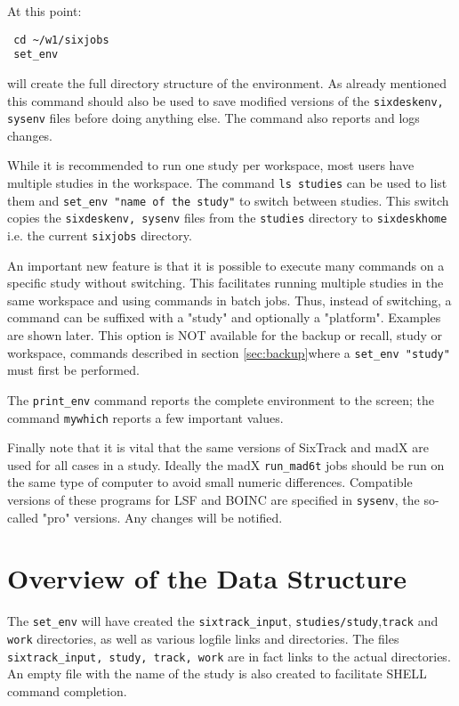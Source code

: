 \documentclass{article}    %
\begin{document}
At this point:
\begin{verbatim}
 cd ~/w1/sixjobs
 set_env
\end{verbatim}
will create the full directory structure of the environment.
As already mentioned this command should also be used to save
modified versions of the {\tt sixdeskenv, sysenv} files before doing
anything else. The command also reports and logs changes. 

While it is recommended to run one study per workspace, most users have
multiple studies in the workspace. The command {\tt ls studies} can be used
to list them and {\tt set\_env "name of the study"} to switch between studies.
This switch copies the {\tt sixdeskenv, sysenv} files from the
{\tt studies} directory to {\tt sixdeskhome} i.e. the current {\tt sixjobs} directory. 

An important new feature is that it is possible to execute many commands
on a specific study without switching. This facilitates running multiple
studies in the same workspace and using commands in batch jobs.  
Thus, instead of switching, a command can be suffixed with a
"study" and optionally a "platform". Examples are shown later.
This option is NOT available for the backup or recall, study or workspace, 
commands described in section \ref{sec:backup}where a {\tt set\_env "study"}
must first be performed.

The {\tt print\_env} command reports the complete environment to the screen;
the command {\tt mywhich} reports a few important values.

Finally note that it is vital that the same versions of SixTrack and madX are used for
all cases in a study. Ideally the madX {\tt run\_mad6t} jobs should be run on the
same type of computer to avoid small numeric differences. Compatible versions of these
programs for LSF and BOINC are specified
in {\tt sysenv}, the so-called "pro" versions. Any changes will
be notified.

\section{Overview of the Data Structure}
The {\tt set\_env} will have created the {\tt sixtrack\_input},
{\tt studies/study},{\tt track} and {\tt work} directories, as well
as various logfile links and directories. 
The files {\tt sixtrack\_input, study, track, work} are in fact
links to the actual directories. An empty file with the name of the study
is also created to facilitate SHELL command completion.     
\end{document}
